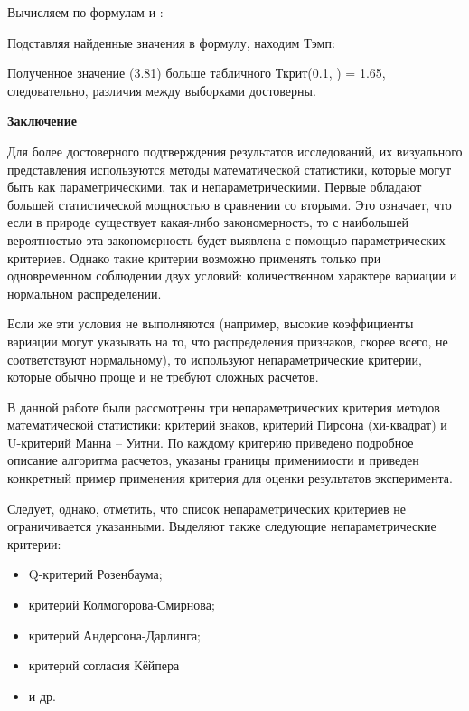 \documentclass[12pt]{article}
\begin{document}
Вычисляем по формулам и :
  
Подставляя найденные значения в формулу, находим Тэмп:
  
Полученное значение (3.81) больше табличного Ткрит(0.1, ) = 1.65, следовательно, различия между выборками достоверны.

\medskip
\textbf{Заключение}

\medskip
Для более достоверного подтверждения результатов исследований, их визуального представления используются методы математической статистики, которые могут быть как параметрическими, так и непараметрическими.
Первые обладают большей статистической мощностью в сравнении со вторыми. Это означает, что если в природе существует какая-либо закономерность, то с наибольшей вероятностью эта закономерность будет выявлена с помощью параметрических критериев. Однако такие критерии возможно применять только при одновременном соблюдении двух условий: количественном характере вариации и нормальном распределении.

Если же эти условия не выполняются (например, высокие коэффициенты вариации могут указывать на то, что распределения признаков, скорее всего, не соответствуют нормальному), то используют непараметрические критерии, которые обычно проще и не требуют сложных расчетов.

В данной работе были рассмотрены три непараметрических критерия методов математической статистики: критерий знаков, критерий Пирсона (хи-квадрат) и U-критерий Манна – Уитни. По каждому критерию приведено подробное описание алгоритма расчетов, указаны границы применимости и приведен конкретный пример применения критерия для оценки результатов эксперимента.

Следует, однако, отметить, что список непараметрических критериев не ограничивается указанными. Выделяют также следующие непараметрические критерии:

\begin{itemize}
    \item Q-критерий Розенбаума;
    \item критерий Колмогорова-Смирнова;
    \item критерий Андерсона-Дарлинга;
    \item критерий согласия Кёйпера
    \item и др.
\end{itemize}
\end{document}
